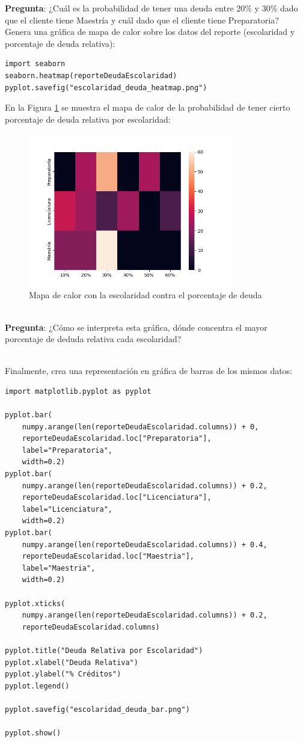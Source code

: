\documentclass{article}
\begin{document}
\textbf{Pregunta}: ¿Cuál es la probabilidad de tener una deuda entre 20\% y 30\% dado que el cliente tiene Maestría y cuál dado que el cliente tiene Preparatoria?
\\[12pt]
Genera una gráfica de mapa de calor sobre los datos del reporte (escolaridad y porcentaje de deuda relativa):
\begin{verbatim}
import seaborn
seaborn.heatmap(reporteDeudaEscolaridad)
pyplot.savefig("escolaridad_deuda_heatmap.png")
\end{verbatim}
En la Figura \ref{fig:escolaridad_deuda_heatmap} se muestra el mapa de calor de la probabilidad de tener cierto porcentaje de deuda relativa por escolaridad:
\begin{figure}[h]
    \centering
    \includegraphics[width=0.8\textwidth]{figures/escolaridad_deuda_heatmap.png}
    \captionsetup{width=\textwidth}
    \caption{Mapa de calor con la escolaridad contra el porcentaje de deuda}
    \label{fig:escolaridad_deuda_heatmap}
\end{figure}
\\[12pt]
\textbf{Pregunta}: ¿Cómo se interpreta esta gráfica, dónde concentra el mayor porcentaje de deduda relativa cada escolaridad?

\clearpage

\hfill\\
Finalmente, crea una representación en gráfica de barras de los mismos datos:
\begin{verbatim}
import matplotlib.pyplot as pyplot

pyplot.bar(
    numpy.arange(len(reporteDeudaEscolaridad.columns)) + 0, 
    reporteDeudaEscolaridad.loc["Preparatoria"],
    label="Preparatoria",
    width=0.2)
pyplot.bar(
    numpy.arange(len(reporteDeudaEscolaridad.columns)) + 0.2, 
    reporteDeudaEscolaridad.loc["Licenciatura"],
    label="Licenciatura",
    width=0.2)
pyplot.bar(
    numpy.arange(len(reporteDeudaEscolaridad.columns)) + 0.4, 
    reporteDeudaEscolaridad.loc["Maestria"],
    label="Maestria",
    width=0.2)

pyplot.xticks(
    numpy.arange(len(reporteDeudaEscolaridad.columns)) + 0.2, 
    reporteDeudaEscolaridad.columns) 

pyplot.title("Deuda Relativa por Escolaridad")
pyplot.xlabel("Deuda Relativa")
pyplot.ylabel("% Créditos")
pyplot.legend()

pyplot.savefig("escolaridad_deuda_bar.png")

pyplot.show()
\end{verbatim}
\end{document}
